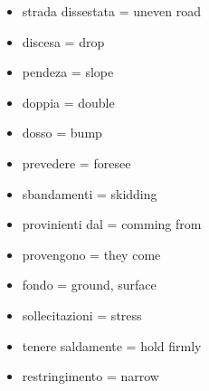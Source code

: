 \begin{itemize}
\item strada dissestata = uneven road
\item discesa = drop
\item pendeza = slope
\item doppia = double
\item dosso = bump
\item prevedere = foresee
\item sbandamenti = skidding
\item provinienti dal = comming from
\item provengono = they come  
\item fondo = ground, surface
\item sollecitazioni = stress
\item tenere saldamente = hold firmly
\item restringimento = narrow  
\end{itemize}


